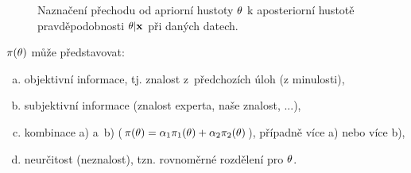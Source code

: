 \begin{figure}[h]
	\centering  
	\caption{Naznačení přechodu od apriorní hustoty $\theta$ k aposteriorní hustotě pravděpodobnosti $\theta|\textbf{x}$ při daných datech.}
	\label{pic1.2}
\end{figure}

$\pi(\theta)$ může představovat:\begin{enumerate}[a)]
	\item objektivní informace, tj. znalost z~předchozích úloh (z minulosti),
	\item subjektivní informace (znalost experta, naše znalost, ...),
	\item kombinace a) a~b) ($\pi(\theta)=\alpha_1\pi_1(\theta)+\alpha_2\pi_2(\theta)$), případně více a) nebo více b),
	\item neurčitost (neznalost), tzn. rovnoměrné rozdělení pro $\theta$.
\end{enumerate}


